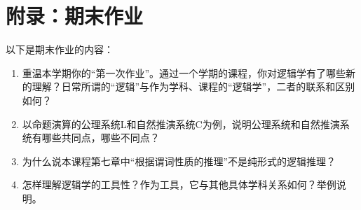 \documentclass[12pt,onecolumn,a4paper]{book}
\numberwithin{table}{subsection}
\numberwithin{equation}{subsection}
\begin{document}





\newpage
\appendix %


\section*{附录：期末作业} %
\label{appendix:A}


以下是期末作业的内容：

\begin{enumerate}[itemsep=0pt,parsep=0pt]
    \item 重温本学期你的“第一次作业”。通过一个学期的课程，你对逻辑学有了哪些新的理解？日常所谓的“逻辑”与作为学科、课程的“逻辑学”，二者的联系和区别如何？
    \item 以命题演算的公理系统L和自然推演系统C为例，说明公理系统和自然推演系统有哪些共同点，哪些不同点？
    \item 为什么说本课程第七章中“根据谓词性质的推理”不是纯形式的逻辑推理？
    \item 怎样理解逻辑学的工具性？作为工具，它与其他具体学科关系如何？举例说明。
\end{enumerate}




\printindex
\end{document}
